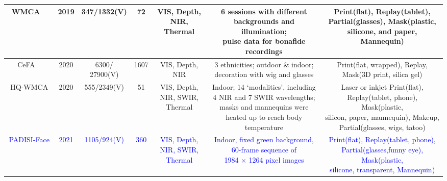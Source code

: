 \documentclass[10pt,journal,compsoc]{IEEEtran}
\begin{document}
\begin{table}
{\begin{tabular}{c c c c c c c}
 \midrule
WMCA
~\cite{george2019biometric} & 2019 & 347/1332(V) & 72 &  \tabincell{c}{VIS, Depth,\\ NIR, Thermal}  &  \tabincell{c}{6 sessions with different \\backgrounds and illumination; \\pulse data for bonafide recordings}  & \tabincell{c}{Print(flat), Replay(tablet),\\ Partial(glasses), Mask(plastic, \\silicone, and paper, Mannequin)}\\


 \midrule
CeFA
~\cite{li2020casia} & 2020 &   \tabincell{c}{6300/\\27900(V)} & 1607 & \tabincell{c}{VIS, Depth,\\NIR} &   \tabincell{c}{3 ethnicities; outdoor \& indoor;\\ decoration with wig and glasses} & \tabincell{c}{Print(flat, wrapped), Replay, \\Mask(3D print, silica gel)}\\


 \midrule
HQ-WMCA
~\cite{heusch2020deep} & 2020 &  555/2349(V) & 51 & \tabincell{c}{VIS, Depth, \\NIR, SWIR,\\Thermal} &   \tabincell{c}{Indoor; 14 `modalities', including \\4
NIR and 7 SWIR wavelengths; \\masks and mannequins were \\heated up to reach body temperature} & \tabincell{c}{Laser or inkjet  Print(flat), \\Replay(tablet, phone), Mask(plastic, \\silicon, paper, mannequin), Makeup,\\ Partial(glasses, wigs, tatoo)}\\

 \midrule
\textcolor{blue}{PADISI-Face
~\cite{rostami2021detection}} & \textcolor{blue}{2021} & \textcolor{blue}{1105/924(V)} & \textcolor{blue}{360} &  \tabincell{c}{\textcolor{blue}{VIS, Depth,}\\ \textcolor{blue}{NIR, SWIR,} \\\textcolor{blue}{Thermal}}  &  \tabincell{c}{\textcolor{blue}{Indoor, fixed green background, } \\\textcolor{blue}{60-frame sequence of }\\\textcolor{blue}{ 1984 × 1264 pixel images}}  & \tabincell{c}{\textcolor{blue}{Print(flat), Replay(tablet, phone),}\\\textcolor{blue}{ Partial(glasses,funny eye), Mask(plastic,} \\\textcolor{blue}{silicone, transparent, Mannequin)}}\\




 \bottomrule[1pt]
 \end{tabular}}
\end{table}
\end{document}
